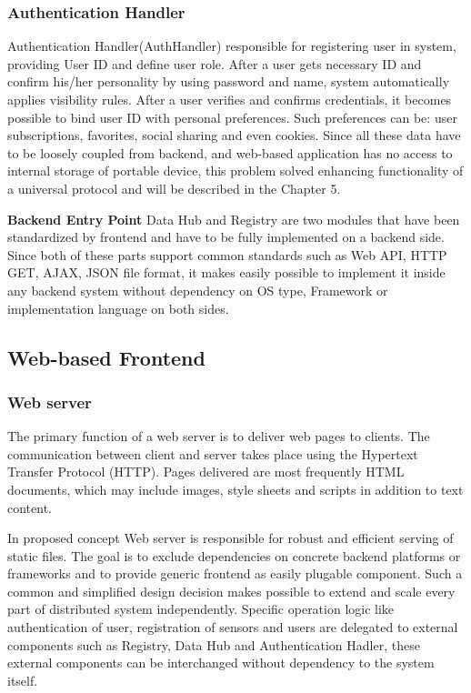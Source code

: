     \subsubsection{Authentication Handler}
    Authentication Handler(AuthHandler) responsible for registering user in system, providing User ID and define user role. After a user gets necessary ID and confirm his/her personality by using password and name, system automatically applies visibility rules. After a user verifies and confirms credentials, it becomes possible to bind user ID with personal preferences. Such preferences can be: user subscriptions, favorites, social sharing and even cookies. Since all these data have to be loosely coupled from backend, and web-based application has no access to internal storage of portable device, this problem solved enhancing functionality of a universal protocol and will be described in the Chapter 5.

    \textbf{Backend Entry Point}
    \newline
    Data Hub and Registry are two modules that have been standardized by frontend and have to be fully implemented on a backend side. Since both of these parts support common standards such as Web API, HTTP GET, AJAX, JSON file format, it makes easily possible to implement it inside any backend system without dependency on OS type, Framework or implementation language on both sides.

  \subsection{Web-based Frontend}
    \subsubsection{Web server}
      The primary function of a web server is to deliver web pages to clients. The communication between client and server takes place using the Hypertext Transfer Protocol (HTTP). Pages delivered are most frequently HTML documents, which may include images, style sheets and scripts in addition to text content. 
  
      In proposed concept Web server is responsible for robust and efficient serving of static files. The goal is to exclude dependencies on concrete backend platforms or frameworks and to provide generic frontend as easily plugable component. Such a common and simplified design decision makes possible to extend and scale every part of distributed system independently. Specific operation logic like authentication of user, registration of sensors and users are delegated to external components such as Registry, Data Hub and Authentication Hadler, these external components can be interchanged without dependency to the system itself.

